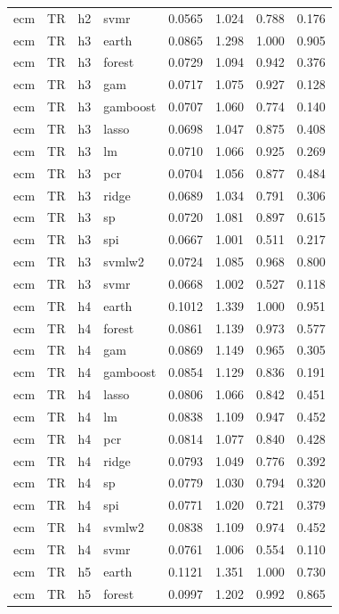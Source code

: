 \begin{ThreePartTable}
\begin{longtable}[t]{llclcccc}
ecm & TR & h2 & svmr & 0.0565 & 1.024 & 0.788 & 0.176\\
\addlinespace
ecm & TR & h3 & earth & 0.0865 & 1.298 & 1.000 & 0.905\\
ecm & TR & h3 & forest & 0.0729 & 1.094 & 0.942 & 0.376\\
ecm & TR & h3 & gam & 0.0717 & 1.075 & 0.927 & 0.128\\
ecm & TR & h3 & gamboost & 0.0707 & 1.060 & 0.774 & 0.140\\
ecm & TR & h3 & lasso & 0.0698 & 1.047 & 0.875 & 0.408\\
ecm & TR & h3 & lm & 0.0710 & 1.066 & 0.925 & 0.269\\
ecm & TR & h3 & pcr & 0.0704 & 1.056 & 0.877 & 0.484\\
ecm & TR & h3 & ridge & 0.0689 & 1.034 & 0.791 & 0.306\\
ecm & TR & h3 & sp & 0.0720 & 1.081 & 0.897 & 0.615\\
ecm & TR & h3 & spi & 0.0667 & 1.001 & 0.511 & 0.217\\
ecm & TR & h3 & svmlw2 & 0.0724 & 1.085 & 0.968 & 0.800\\
ecm & TR & h3 & svmr & 0.0668 & 1.002 & 0.527 & 0.118\\
\addlinespace
ecm & TR & h4 & earth & 0.1012 & 1.339 & 1.000 & 0.951\\
ecm & TR & h4 & forest & 0.0861 & 1.139 & 0.973 & 0.577\\
ecm & TR & h4 & gam & 0.0869 & 1.149 & 0.965 & 0.305\\
ecm & TR & h4 & gamboost & 0.0854 & 1.129 & 0.836 & 0.191\\
ecm & TR & h4 & lasso & 0.0806 & 1.066 & 0.842 & 0.451\\
ecm & TR & h4 & lm & 0.0838 & 1.109 & 0.947 & 0.452\\
ecm & TR & h4 & pcr & 0.0814 & 1.077 & 0.840 & 0.428\\
ecm & TR & h4 & ridge & 0.0793 & 1.049 & 0.776 & 0.392\\
ecm & TR & h4 & sp & 0.0779 & 1.030 & 0.794 & 0.320\\
ecm & TR & h4 & spi & 0.0771 & 1.020 & 0.721 & 0.379\\
ecm & TR & h4 & svmlw2 & 0.0838 & 1.109 & 0.974 & 0.452\\
ecm & TR & h4 & svmr & 0.0761 & 1.006 & 0.554 & 0.110\\
\addlinespace
ecm & TR & h5 & earth & 0.1121 & 1.351 & 1.000 & 0.730\\
ecm & TR & h5 & forest & 0.0997 & 1.202 & 0.992 & 0.865\\

\end{longtable}
\end{ThreePartTable}
